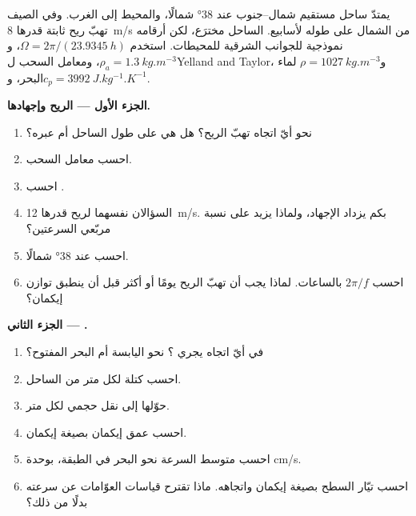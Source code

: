 \begin{problem}
\label{pb:b1:ocean-circulation:1}
يمتدّ ساحل مستقيم شمال–جنوب عند \ang{38} شمالًا، والمحيط إلى الغرب. وفي الصيف تهبّ ريح ثابتة قدرها \qty{8}{m/s} من الشمال على طوله لأسابيع. الساحل مخترَع، لكن أرقامه نموذجية للجوانب الشرقية للمحيطات. استخدم $\Omega = 2\pi/(\qty{23.9345}{h})$، و$\rho_a = \qty{1.3}{kg.m^{-3}}$، ومعامل السحب لYelland and Taylor، و$\rho = \qty{1027}{kg.m^{-3}}$ لماء البحر، و$c_p = \qty{3992}{J.kg^{-1}.K^{-1}}$.

\medskip
\noindent\textbf{الجزء الأول --- الريح وإجهادها.}
\begin{enumerate}
  \item نحو أيّ اتجاه تهبّ الريح؟ هل هي على طول الساحل أم عبره؟
  \item احسب معامل السحب.
  \item احسب .
  \item السؤالان نفسهما لريح قدرها \qty{12}{m/s}. بكم يزداد الإجهاد، ولماذا يزيد على نسبة مربّعي السرعتين؟
  \item احسب  عند \ang{38} شمالًا.
  \item احسب $2\pi/f$ بالساعات. لماذا يجب أن تهبّ الريح يومًا أو أكثر قبل أن ينطبق توازن إيكمان؟
\end{enumerate}

\medskip
\noindent\textbf{الجزء الثاني --- .}
\begin{enumerate}[resume]
  \item في أيّ اتجاه يجري ؟ نحو اليابسة أم البحر المفتوح؟
  \item احسب كتلة  لكل متر من الساحل.
  \item حوّلها إلى نقل حجمي لكل متر.
  \item احسب عمق إيكمان بصيغة إيكمان.
  \item احسب متوسط السرعة نحو البحر في الطبقة، بوحدة \unit{cm/s}.
  \item احسب تيّار السطح بصيغة إيكمان واتجاهه. ماذا تقترح قياسات العوّامات عن سرعته بدلًا من ذلك؟
\end{enumerate}


\end{problem}
